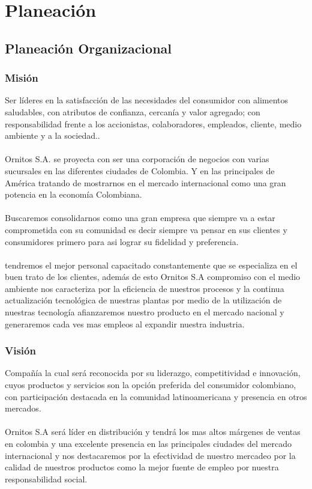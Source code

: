 \chapter{Planeaci\'on}
\section{Planeaci\'on Organizacional}
\subsection{Misi\'on}
Ser l\'ideres en la satisfacci\'on de las necesidades del consumidor con alimentos saludables, con atributos de confianza, cercan\'ia y valor agregado; con responsabilidad frente a los accionistas, colaboradores, empleados, cliente, medio ambiente y a la sociedad..%
\\%
\\%
Ornitos S.A. se proyecta con ser  una corporaci\'on de negocios con varias sucursales en las diferentes ciudades de  Colombia. Y en las principales de Am\'erica tratando de mostrarnos en el mercado internacional como una gran potencia en la economía Colombiana.
\\%
\\%
Buscaremos consolidarnos como una gran empresa que siempre va a estar comprometida con su comunidad es decir siempre va pensar en sus clientes y consumidores primero para asi lograr su fidelidad y preferencia.
\\%
\\%
tendremos el mejor personal capacitado constantemente que se especializa en el buen trato de los clientes, además de esto Ornitos S.A compromiso con el medio ambiente nos caracteriza por la eficiencia de nuestros procesos y la continua actualizaci\'on tecnol\'ogica de nuestras plantas por medio de la utilización de nuestras tecnología afianzaremos nuestro producto en el mercado nacional y generaremos cada ves mas empleos al expandir nuestra industria.
%
\subsection{Visi\'on}
Compa\~n\'ia la cual ser\'a reconocida por su liderazgo, competitividad e innovaci\'on, cuyos productos y servicios son la opci\'on preferida del consumidor colombiano, con participaci\'on destacada en la comunidad latinoamericana y presencia en otros mercados.
\\%
\\%
Ornitos S.A ser\'a l\'ider en distribuci\'on y tendr\'a los mas altos m\'argenes de ventas en colombia y una excelente presencia en las principales ciudades del mercado internacional y nos destacaremos por la efectividad de nuestro mercadeo por la calidad de nuestros productos como la mejor fuente de empleo por nuestra responsabilidad social.
